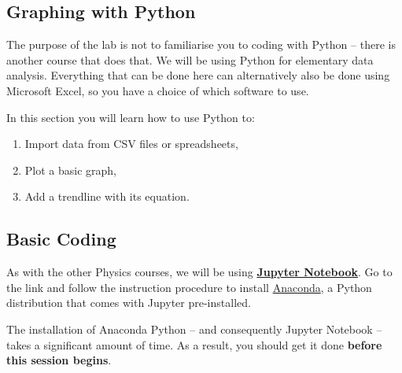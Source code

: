 \subsection{Graphing with Python}

The purpose of the lab is not to familiarise you to coding with Python -- there is another course that does that. We will be using Python for elementary data analysis. Everything that can be done here can alternatively also be done using Microsoft Excel, so you have a choice of which software to use.



In this section you will learn how to use Python to:

\begin{enumerate}
    \item Import data from CSV files or spreadsheets,
    \item Plot a basic graph,
    \item Add a trendline with its equation.
\end{enumerate}

\subsection{Basic Coding}

As with the other Physics courses, we will be using \textbf{\href{https://jupyter.org}{Jupyter Notebook}}. Go to the link and follow the instruction procedure to install \href{https://www.anaconda.com/downloads}{Anaconda}, a Python distribution that comes with Jupyter pre-installed.

\begin{imp}
The installation of Anaconda Python -- and consequently Jupyter Notebook -- takes a significant amount of time. As a result, you should get it done \textbf{before this session begins}. 
\end{imp}















\newpage